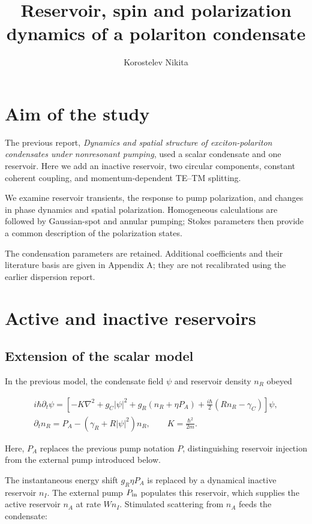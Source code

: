 \documentclass[12pt,a4paper]{article}
\title{Reservoir, spin and polarization dynamics of a polariton condensate}
\author{Korostelev Nikita}
\date{}
\begin{document}
\maketitle
\clearpage



\section*{Aim of the study}

The previous report, \emph{Dynamics and spatial structure of exciton-polariton condensates under nonresonant pumping}, used a scalar condensate and one reservoir. Here we add an inactive reservoir, two circular components, constant coherent coupling, and momentum-dependent TE--TM splitting.

We examine reservoir transients, the response to pump polarization, and changes in phase dynamics and spatial polarization. Homogeneous calculations are followed by Gaussian-spot and annular pumping; Stokes parameters then provide a common description of the polarization states.

The condensation parameters are retained. Additional coefficients and their literature basis are given in Appendix A; they are not recalibrated using the earlier dispersion report.

\section{Active and inactive reservoirs}

\subsection{Extension of the scalar model}

In the previous model, the condensate field \(\psi\) and reservoir density \(n_R\) obeyed

\[
\begin{gathered}
i\hbar\partial_t\psi=
\left[-K\nabla^2+g_C|\psi|^2+g_R(n_R+\eta P_A)
+\frac{i\hbar}{2}(Rn_R-\gamma_C)\right]\psi,
\\
\partial_t n_R=P_A-(\gamma_R+R|\psi|^2)n_R,
\qquad K=\frac{\hbar^2}{2m}.
\end{gathered}
\tag{1}\label{eq:1}
\]

Here, \(P_A\) replaces the previous pump notation \(P\), distinguishing reservoir injection from the external pump introduced below.

The instantaneous energy shift \(g_R\eta P_A\) is replaced by a dynamical inactive reservoir \(n_I\). The external pump \(P_{\rm in}\) populates this reservoir, which supplies the active reservoir \(n_A\) at rate \(Wn_I\). Stimulated scattering from \(n_A\) feeds the condensate:
\end{document}
